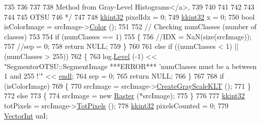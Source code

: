 \begin{DoxyCode}
{{{{{{{{{{{{{{{{{{{{{{{{{{{{{{{{{{{{{735 \textcolor{comment}{  %
736 \textcolor{comment}{  %
737 \textcolor{comment}{  %
738 \textcolor{comment}{  %
       Method from Gray-Level Histograms</a>,}
739 \textcolor{comment}{  %
740 \textcolor{comment}{  %
741 \textcolor{comment}{  %
742 \textcolor{comment}{  %
743 \textcolor{comment}{  %
744 \textcolor{comment}{  %
745 \textcolor{comment}{  %
       OTSU}
746 \textcolor{comment}{  */}
747   
748   \hyperlink{namespace_k_k_b_a8fa4952cc84fda1de4bec1fbdd8d5b1b}{kkint32}  pixelIdx = 0;
749   \hyperlink{namespace_k_k_b_a8fa4952cc84fda1de4bec1fbdd8d5b1b}{kkint32}  x        = 0;
750   \textcolor{keywordtype}{bool}  isColorImage = srcImage->\hyperlink{class_k_k_b_1_1_raster_a644248f99009d64ac4b8fef4a22aff25}{Color} ();
751 
752   \textcolor{comment}{//  Checking numClasses (number of classes)}
753   
754   \textcolor{keywordflow}{if}  (numClasses == 1)
755   \{
756     \textcolor{comment}{//IDX = NaN(size(srcImage));}
757     \textcolor{comment}{//sep = 0;}
758     \textcolor{keywordflow}{return}  NULL;
759   \}
760 
761   \textcolor{keywordflow}{else} \textcolor{keywordflow}{if}  ((numClasses < 1)  ||  (numClasses > 255))
762   \{
763     log.\hyperlink{class_k_k_b_1_1_run_log_a32cf761d7f2e747465fd80533fdbb659}{Level} (-1) << \textcolor{stringliteral}{"SegmentorOTSU::SegmentImage  ***ERROR***   'numClasses must be a between 1 and
       255 !'"} << \hyperlink{namespace_k_k_b_ad1f50f65af6adc8fa9e6f62d007818a8}{endl};
764     sep = 0;
765     \textcolor{keywordflow}{return} NULL;
766   \}
767 
768   \textcolor{keywordflow}{if}  (isColorImage)
769   \{
770     srcImage = srcImage->\hyperlink{class_k_k_b_1_1_raster_afc5e92625a20de51791bd369340d9fa2}{CreateGrayScaleKLT} ();
771   \}
772   \textcolor{keywordflow}{else}
773   \{
774     srcImage = \textcolor{keyword}{new} \hyperlink{class_k_k_b_1_1_raster}{Raster} (*srcImage);
775   \}
776 
777   \hyperlink{namespace_k_k_b_a8fa4952cc84fda1de4bec1fbdd8d5b1b}{kkint32}  totPixels = srcImage->\hyperlink{class_k_k_b_1_1_raster_a174a392b71afc2295a0ccbfca3d984e9}{TotPixels} ();
778   \hyperlink{namespace_k_k_b_a8fa4952cc84fda1de4bec1fbdd8d5b1b}{kkint32}  pixelsCounted = 0;
779   \hyperlink{namespace_k_k_b_a791ebe73f89917067a7aab9dbd817e45}{VectorInt}  unI;
}}}}}}}}}}}}}}}}}}}}}}}}}}}}}}}}}}}}}}}}}}}}}}
\end{DoxyCode}
